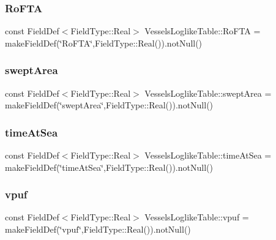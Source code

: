 \mbox{\label{class_vessels_loglike_table_a5ebf4708c84bb2b7b79423cd54307096}} 
\subsubsection{\texorpdfstring{RoFTA}{RoFTA}}
{\footnotesize\ttfamily const Field\+Def$<$Field\+Type\+::\+Real$>$ Vessels\+Loglike\+Table\+::\+Ro\+F\+TA = make\+Field\+Def(\char`\"{}Ro\+F\+TA\char`\"{},Field\+Type\+::\+Real()).not\+Null()}

\mbox{\label{class_vessels_loglike_table_a9bbfe4e61fff420c054851ebeb3e1182}} 
\subsubsection{\texorpdfstring{sweptArea}{sweptArea}}
{\footnotesize\ttfamily const Field\+Def$<$Field\+Type\+::\+Real$>$ Vessels\+Loglike\+Table\+::swept\+Area = make\+Field\+Def(\char`\"{}swept\+Area\char`\"{},Field\+Type\+::\+Real()).not\+Null()}

\mbox{\label{class_vessels_loglike_table_ae663140fea116a90635dacdfd7231a94}} 
\subsubsection{\texorpdfstring{timeAtSea}{timeAtSea}}
{\footnotesize\ttfamily const Field\+Def$<$Field\+Type\+::\+Real$>$ Vessels\+Loglike\+Table\+::time\+At\+Sea = make\+Field\+Def(\char`\"{}time\+At\+Sea\char`\"{},Field\+Type\+::\+Real()).not\+Null()}

\mbox{\label{class_vessels_loglike_table_a48a1f37966234c07e77dc53e2155a087}} 
\subsubsection{\texorpdfstring{vpuf}{vpuf}}
{\footnotesize\ttfamily const Field\+Def$<$Field\+Type\+::\+Real$>$ Vessels\+Loglike\+Table\+::vpuf = make\+Field\+Def(\char`\"{}vpuf\char`\"{},Field\+Type\+::\+Real()).not\+Null()}



